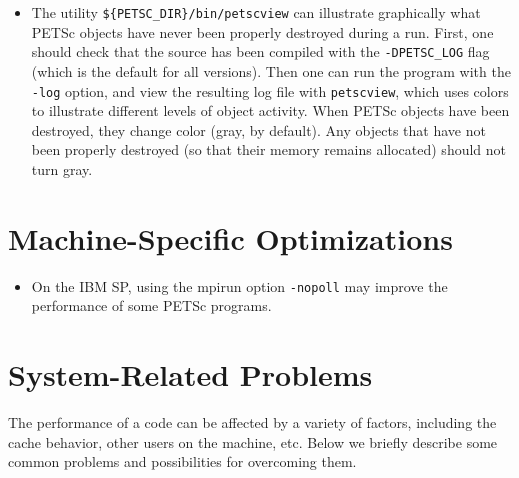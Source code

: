 \begin{itemize}
\item The utility {\tt \$\{PETSC\_DIR\}/bin/petscview} can illustrate graphically
what PETSc objects have never been properly destroyed during a run.  
First, one should check that the source has been compiled with the
{\tt -DPETSC\_LOG} flag (which is the default for all versions).
Then one can run the program with the {\tt -log} option, and view the resulting
log file with {\tt petscview}, which uses colors to illustrate different
levels of object activity.  When PETSc objects have been destroyed,
they change color (gray, by default).  Any objects that have not
been properly destroyed (so that their memory remains allocated)
should not turn gray.
\end{itemize}

\section{Machine-Specific Optimizations}

\begin{itemize}
\item On the IBM SP, using the mpirun option {\tt -nopoll} may
      improve the performance of some PETSc programs.
\end{itemize}

\section{System-Related Problems}

The performance of a code can be affected by a variety of factors, 
including the cache behavior, other users on the machine, etc.
Below we briefly describe some common problems and possibilities for
overcoming them.


